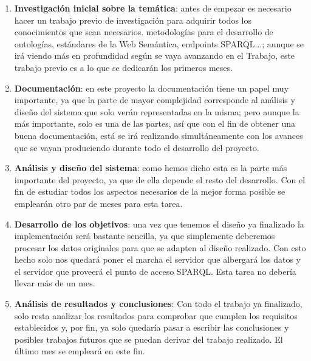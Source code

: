\begin{enumerate}
	\item \textbf{Investigación inicial sobre la temática}: antes de empezar es necesario hacer un trabajo previo de investigación para adquirir todos los conocimientos que sean necesarios. metodologías para el desarrollo de ontologías, estándares de {\sf la Web Semántica}, endpoints {\sf SPARQL}...; aunque se irá viendo más en profundidad según se vaya avanzando en el {\sf Trabajo}, este trabajo previo es a lo que se dedicarán los primeros meses.
	\item \textbf{Documentación}: en este proyecto la documentación tiene un papel muy importante, ya que la parte de mayor complejidad corresponde al análisis y diseño del sistema que solo verán representadas en la misma; pero aunque la más importante, solo es una de las partes, así que con el fin de obtener una buena documentación, está se irá realizando simultáneamente con los avances que se vayan produciendo durante todo el desarrollo del proyecto.
	\item \textbf{Análisis y diseño del sistema}: como hemos dicho esta es la parte más importante del proyecto, ya que de ella depende el resto del desarrollo. Con el fin de estudiar todos los aspectos necesarios de la mejor forma posible se emplearán otro par de meses para esta tarea.
	\newpage
	\item \textbf{Desarrollo de los objetivos}: una vez que tenemos el diseño ya finalizado la implementación será bastante sencilla, ya que simplemente deberemos procesar los datos originales para que se adapten al diseño realizado. Con esto hecho solo nos quedará poner el marcha el servidor que albergará los datos y el servidor que proveerá el punto de acceso {\sf SPARQL}. Esta tarea no debería llevar más de un mes.
	\item \textbf{Análisis de resultados y conclusiones}: Con todo el trabajo ya finalizado, solo resta analizar los resultados para comprobar que cumplen los requisitos establecidos y, por fin, ya solo quedaría pasar a escribir las conclusiones y posibles trabajos futuros que se puedan derivar del trabajo realizado. El último mes se empleará en este fin.
\end{enumerate}